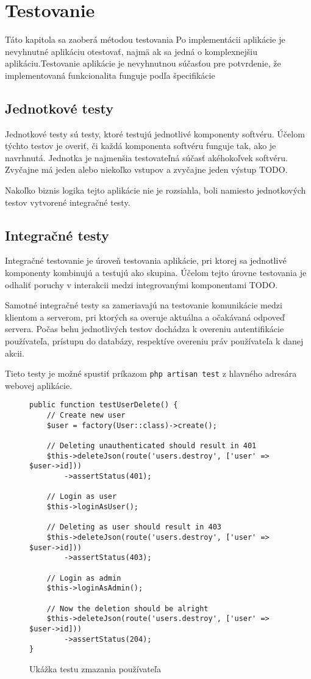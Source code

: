 \chapter{Testovanie}
Táto kapitola sa zaoberá métodou testovania Po implementácii aplikácie je nevyhnutné aplikáciu otestovať, najmä ak sa jedná o komplexnejšiu aplikáciu.Testovanie aplikácie je nevyhnutnou súčasťou pre potvrdenie, že implementovaná funkcionalita funguje podľa špecifikácie

\section{Jednotkové testy}
Jednotkové testy sú testy, ktoré testujú jednotlivé komponenty softvéru. Účelom týchto testov je overiť, či každá komponenta softvéru funguje tak, ako je navrhnutá. Jednotka je najmenšia testovateľná súčasť akéhokoľvek softvéru. Zvyčajne má jeden alebo niekoľko vstupov a zvyčajne jeden výstup TODO.

Nakoľko biznis logika tejto aplikácie nie je rozsiahla, boli namiesto jednotkových testov vytvorené integračné testy.

\section{Integračné testy}
Integračné testovanie je úroveň testovania aplikácie, pri ktorej sa jednotlivé komponenty kombinujú a testujú ako skupina. Účelom tejto úrovne testovania je odhaliť poruchy v interakcii medzi integrovanými komponentami TODO.

Samotné integračné testy sa zameriavajú na testovanie komunikácie medzi klientom a serverom, pri ktorých sa overuje aktuálna a očakávaná odpoveď servera. Počas behu jednotlivých testov dochádza k overeniu autentifikácie používateľa, prístupu do databázy, respektíve overeniu práv používateľa k danej akcii.

Tieto testy je možné spustiť príkazom \texttt{php artisan test} z hlavného adresára webovej aplikácie.

\begin{figure}[H]
\begin{verbatim}
public function testUserDelete() {
    // Create new user
    $user = factory(User::class)->create();

    // Deleting unauthenticated should result in 401
    $this->deleteJson(route('users.destroy', ['user' => $user->id]))
        ->assertStatus(401);

    // Login as user
    $this->loginAsUser();

    // Deleting as user should result in 403
    $this->deleteJson(route('users.destroy', ['user' => $user->id]))
        ->assertStatus(403);

    // Login as admin
    $this->loginAsAdmin();

    // Now the deletion should be alright
    $this->deleteJson(route('users.destroy', ['user' => $user->id]))
        ->assertStatus(204);
}
\end{verbatim}
\caption[Ukážka testu zmazania používateľa]
{Ukážka testu zmazania používateľa}
\label{user-delete-test-code}
\end{figure}

